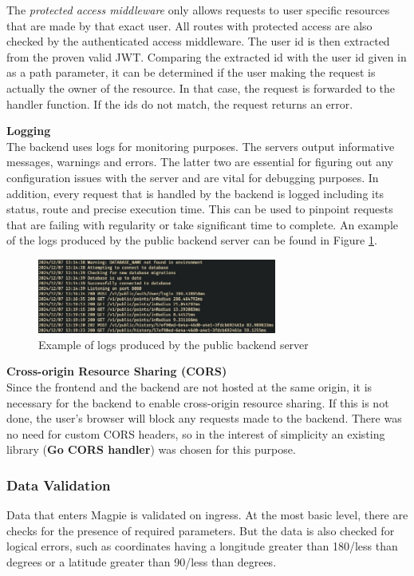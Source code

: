 The \textit{protected access middleware} only allows requests to user specific
resources that are made by that exact user. All routes with protected access are
also checked by the authenticated access middleware. The user id is then
extracted from the proven valid JWT. Comparing the extracted id with the user id
given in as a path parameter, it can be determined if the user making the
request is actually the owner of the resource. In that case, the request is
forwarded to the handler function. If the ids do not match, the request returns
an error.

\label{middleware_logging}\textbf{Logging}\\
The backend uses logs for monitoring purposes. The servers output informative
messages, warnings and errors. The latter two are essential for figuring out any
configuration issues with the server and are vital for debugging purposes. In
addition, every request that is handled by the backend is logged including its
status, route and precise execution time. This can be used to pinpoint requests
that are failing with regularity or take significant time to complete. An
example of the logs produced by the public backend server can be found in Figure
\ref{fig:backend_logging}.

\begin{figure}[htbp]
  \centering{}
  \includegraphics[width=0.7\textwidth]{images/backend_logging.png}
  \caption{Example of logs produced by the public backend server}
  \label{fig:backend_logging}
\end{figure}

\newpage{}

\label{middleware_cors}\textbf{Cross-origin Resource Sharing (CORS)}\\
Since the frontend and the backend are not hosted at the same origin, it is
necessary for the backend to enable cross-origin resource sharing. If this is
not done, the user's browser will block any requests made to the backend. There
was no need for custom CORS headers, so in the interest of simplicity an
existing library (\textbf{Go CORS handler}) was chosen for this purpose.

\subsubsection{Data Validation}
Data that enters Magpie is validated on ingress. At the most basic level, there
are checks for the presence of required parameters. But the data is also checked
for logical errors, such as coordinates having a longitude greater than 180/less
than  degrees or a latitude greater than 90/less than  degrees.

